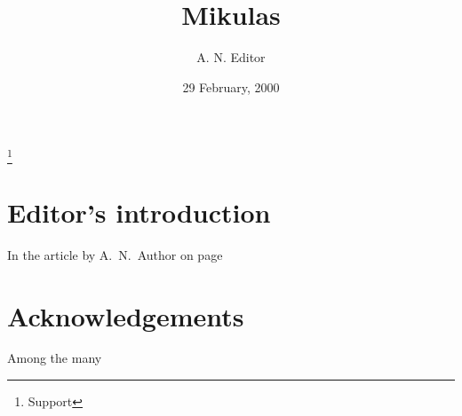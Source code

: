 \documentclass[11pt]{combine}
\begin{document}
\title{Mikulas}
\author{A. N. Editor}
\thanks{Support}
\date{29 February, 2000}


\pagestyle{combine}        %
\maketitle                 %
\tableofcontents           %
\clearpage

\section{Editor’s introduction} 
\label{intro}  %
In the article by A.~N.~Author on page~%
\begin{papers}                  %
\label{art1}
% 
\end{papers}                    %

\section{Acknowledgements}      %
Among the many 
\end{document}
